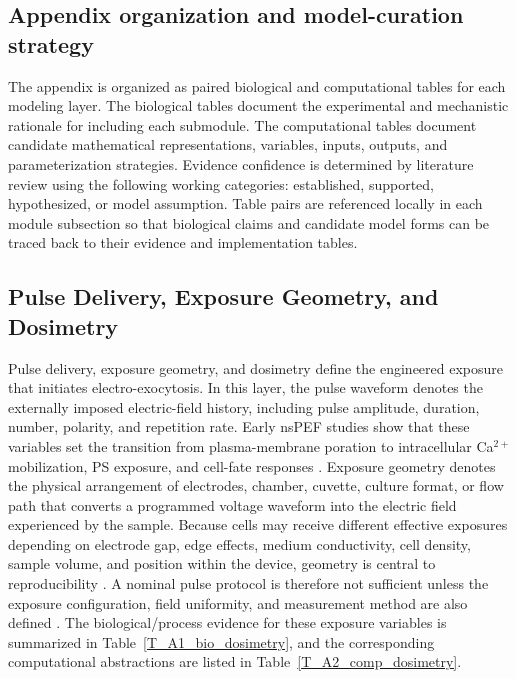 \subsection*{Appendix organization and model-curation strategy}
The appendix is organized as paired biological and computational tables for each modeling layer. The biological tables document the experimental and mechanistic rationale for including each submodule. The computational tables document candidate mathematical representations, variables, inputs, outputs, and parameterization strategies. Evidence confidence is determined by literature review using the following working categories: established, supported, hypothesized, or model assumption. Table pairs are referenced locally in each module subsection so that biological claims and candidate model forms can be traced back to their evidence and implementation tables.

\subsection*{Pulse Delivery, Exposure Geometry, and Dosimetry}

Pulse delivery, exposure geometry, and dosimetry define the engineered exposure that initiates electro-exocytosis. In this layer, the pulse waveform denotes the externally imposed electric-field history, including pulse amplitude, duration, number, polarity, and repetition rate. Early nsPEF studies show that these variables set the transition from plasma-membrane poration to intracellular Ca$^{2+}$ mobilization, PS exposure, and cell-fate responses \cite{beebe2003nanosecond,vernier2003calcium,pakhomov2007membrane,semenov2013primary}. Exposure geometry denotes the physical arrangement of electrodes, chamber, cuvette, culture format, or flow path that converts a programmed voltage waveform into the electric field experienced by the sample. Because cells may receive different effective exposures depending on electrode gap, edge effects, medium conductivity, cell density, sample volume, and position within the device, geometry is central to reproducibility \cite{joshi2000electroporation,kotnik2019membrane,baker2024numerical}. A nominal pulse protocol is therefore not sufficient unless the exposure configuration, field uniformity, and measurement method are also defined \cite{rems2013cell,leveque2017measurement}. The biological/process evidence for these exposure variables is summarized in Table~\ref{T_A1_bio_dosimetry}, and the corresponding computational abstractions are listed in Table~\ref{T_A2_comp_dosimetry}.

